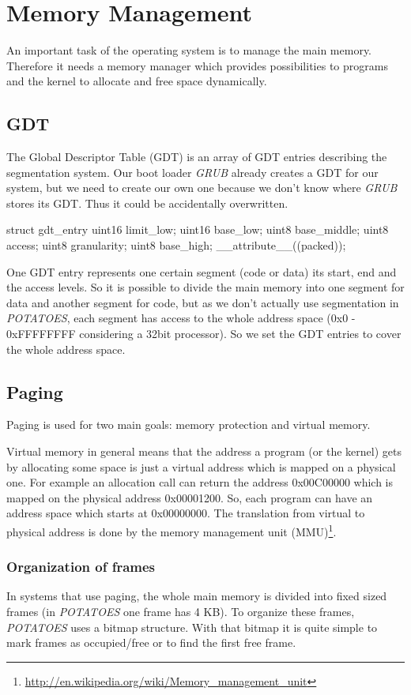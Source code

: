 \documentclass[11pt,a4paper]{scrartcl}
\begin{document}
\section{Memory Management}
An important task of the operating system is to manage the main memory.
Therefore it needs a memory manager which provides possibilities to programs and the kernel to allocate and free space dynamically.
\subsection{GDT}
The Global Descriptor Table (GDT) is an array of GDT entries describing the segmentation system.
Our boot loader \textit{GRUB} already creates a GDT for our system, but we need to create our own one because we don't know where \textit{GRUB} stores its GDT. Thus it could be accidentally overwritten.\\

\begin{code}[kernel/mm/mm.h]
struct gdt_entry {
	uint16 limit_low;
	uint16 base_low;
	uint8  base_middle;
	uint8  access;
	uint8  granularity;
	uint8  base_high;
} __attribute__((packed));
\end{code}
One GDT entry represents one certain segment (code or data) its start, end and the access levels.
So it is possible to divide the main memory into one segment for data and another segment for code, but as we don't actually use segmentation in \textit{POTATOES}, each segment has access to the whole address space (0x0 - 0xFFFFFFFF considering a 32bit processor). So we set the GDT entries to cover the whole address space.

\subsection{Paging}
Paging is used for two main goals: memory protection and virtual memory.

Virtual memory in general means that the address a program (or the kernel) gets by allocating some space is just a virtual address which is mapped on a physical one. For example an allocation call can return the address 0x00C00000 which is mapped on the physical address 0x00001200. So, each program can have an address space which starts at 0x00000000. The translation from virtual to physical address is done by the memory management unit (MMU)\footnote{\url{http://en.wikipedia.org/wiki/Memory_management_unit}}.
\subsubsection{Organization of frames}
In systems that use paging, the whole main memory is divided into fixed sized frames (in \textit{POTATOES} one frame has 4 KB).
To organize these frames, \textit{POTATOES} uses a bitmap structure. With that bitmap it is quite simple to mark frames as occupied/free or to find the first free frame.
\end{document}
